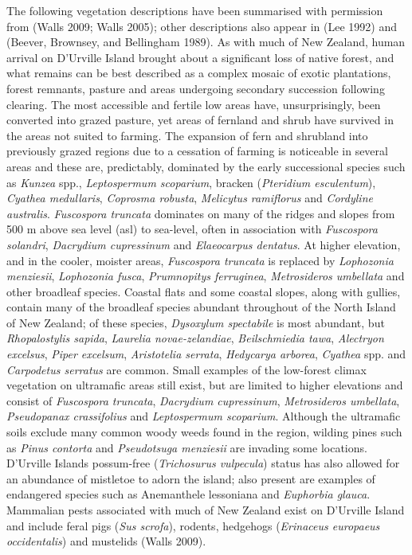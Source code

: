 \documentclass[]{article}
\begin{document}
The following vegetation descriptions have been summarised with permission from (Walls 2009; Walls 2005); other descriptions also appear in (Lee 1992) and (Beever, Brownsey, and Bellingham 1989). As with much of New Zealand, human arrival on D'Urville Island brought about a significant loss of native forest, and what remains can be best described as a complex mosaic of exotic plantations, forest remnants, pasture and areas undergoing secondary succession following clearing. The most accessible and fertile low areas have, unsurprisingly, been converted into grazed pasture, yet areas of fernland and shrub have survived in the areas not suited to farming. The expansion of fern and shrubland into previously grazed regions due to a cessation of farming is noticeable in several areas and these are, predictably, dominated by the early successional species such as \emph{Kunzea} spp., \emph{Leptospermum scoparium}, bracken (\emph{Pteridium esculentum}), \emph{Cyathea medullaris}, \emph{Coprosma robusta}, \emph{Melicytus ramiflorus} and \emph{Cordyline australis}. \emph{Fuscospora truncata} dominates on many of the ridges and slopes from 500 m above sea level (asl) to sea-level, often in association with \emph{Fuscospora solandri}, \emph{Dacrydium cupressinum} and \emph{Elaeocarpus dentatus}. At higher elevation, and in the cooler, moister areas, \emph{Fuscospora truncata} is replaced by \emph{Lophozonia menziesii}, \emph{Lophozonia fusca}, \emph{Prumnopitys ferruginea}, \emph{Metrosideros umbellata} and other broadleaf species. Coastal flats and some coastal slopes, along with gullies, contain many of the broadleaf species abundant throughout of the North Island of New Zealand; of these species, \emph{Dysoxylum spectabile} is most abundant, but \emph{Rhopalostylis sapida}, \emph{Laurelia novae-zelandiae}, \emph{Beilschmiedia tawa}, \emph{Alectryon excelsus}, \emph{Piper excelsum}, \emph{Aristotelia serrata}, \emph{Hedycarya arborea}, \emph{Cyathea} spp. and \emph{Carpodetus serratus} are common. Small examples of the low-forest climax vegetation on ultramafic areas still exist, but are limited to higher elevations and consist of \emph{Fuscospora truncata}, \emph{Dacrydium cupressinum}, \emph{Metrosideros umbellata}, \emph{Pseudopanax crassifolius} and \emph{Leptospermum scoparium}. Although the ultramafic soils exclude many common woody weeds found in the region, wilding pines such as \emph{Pinus contorta} and \emph{Pseudotsuga menziesii} are invading some locations. D'Urville Islands possum-free (\emph{Trichosurus vulpecula}) status has also allowed for an abundance of mistletoe to adorn the island; also present are examples of endangered species such as Anemanthele lessoniana and \emph{Euphorbia glauca}. Mammalian pests associated with much of New Zealand exist on D'Urville Island and include feral pigs (\emph{Sus scrofa}), rodents, hedgehogs (\emph{Erinaceus europaeus occidentalis}) and mustelids (Walls 2009).
\end{document}
